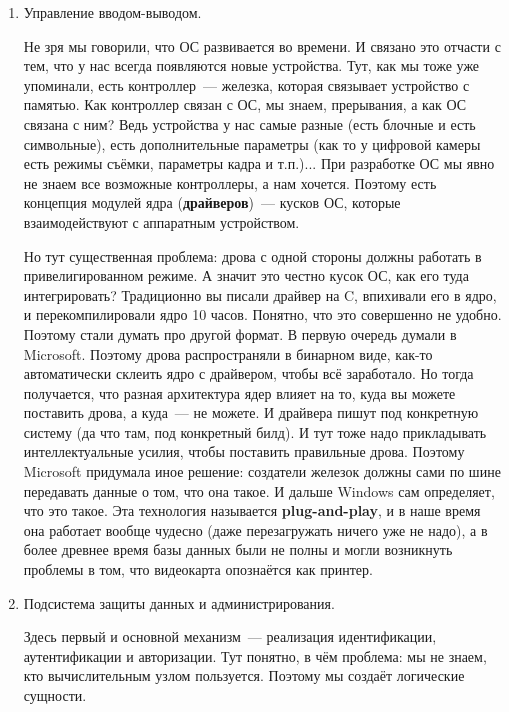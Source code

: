 \documentclass{article}
\begin{document}
\begin{enumerate}
        \item Управление вводом-выводом.
        
        Не зря мы говорили, что ОС развивается во времени. И связано это отчасти с тем, что у нас всегда появляются новые устройства. Тут, как мы тоже уже упоминали, есть контроллер~--- железка, которая связывает устройство с памятью. Как контроллер связан с ОС, мы знаем, прерывания, а как ОС связана с ним? Ведь устройства у нас самые разные (есть блочные и есть символьные), есть дополнительные параметры (как то у цифровой камеры есть режимы съёмки, параметры кадра и т.п.)... При разработке ОС мы явно не знаем все возможные контроллеры, а нам хочется. Поэтому есть концепция модулей ядра (\textbf{драйверов})~--- кусков ОС, которые взаимодействуют с аппаратным устройством.
        
        Но тут существенная проблема: дрова с одной стороны должны работать в привелигированном режиме. А значит это честно кусок ОС, как его туда интегрировать? Традиционно вы писали драйвер на C, впихивали его в ядро, и перекомпилировали ядро 10 часов. Понятно, что это совершенно не удобно. Поэтому стали думать про другой формат. В первую очередь думали в Microsoft. Поэтому дрова распространяли в бинарном виде, как-то автоматически склеить ядро с драйвером, чтобы всё заработало. Но тогда получается, что разная архитектура ядер влияет на то, куда вы можете поставить дрова, а куда~--- не можете. И драйвера пишут под конкретную систему (да что там, под конкретный билд). И тут тоже надо прикладывать интеллектуальные усилия, чтобы поставить правильные дрова. Поэтому Microsoft придумала иное решение: создатели железок должны сами по шине передавать данные о том, что она такое. И дальше Windows сам определяет, что это такое. Эта технология называется \textbf{plug-and-play}, и в наше время она работает вообще чудесно (даже перезагружать ничего уже не надо), а в более древнее время базы данных были не полны и могли возникнуть проблемы в том, что видеокарта опознаётся как принтер.
        
        \item Подсистема защиты данных и администрирования.
        
        Здесь первый и основной механизм~--- реализация идентификации, аутентификации и авторизации. Тут понятно, в чём проблема: мы не знаем, кто вычислительным узлом пользуется. Поэтому мы создаёт логические сущности.
        

\end{enumerate}
\end{document}
